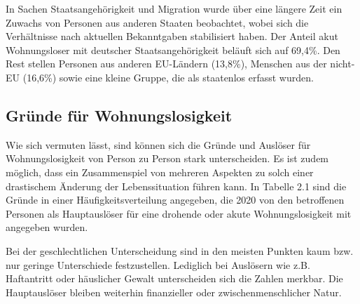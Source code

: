In Sachen Staatsangehörigkeit und Migration wurde über eine längere Zeit ein Zuwachs von Personen aus anderen Staaten beobachtet, wobei sich die Verhältnisse nach aktuellen Bekanntgaben stabilisiert haben. Der Anteil akut Wohnungsloser mit deutscher Staatsangehörigkeit beläuft sich auf 69,4\%. Den Rest stellen Personen aus anderen EU-Ländern (13,8\%), Menschen aus der nicht-EU (16,6\%) sowie eine kleine Gruppe, die als staatenlos erfasst wurden.

\subsection{Gründe für Wohnungslosigkeit}

Wie sich vermuten lässt, sind können sich die Gründe und Auslöser für Wohnungslosigkeit von Person zu Person stark unterscheiden. Es ist zudem möglich, dass ein Zusammenspiel von mehreren Aspekten zu solch einer drastischem Änderung der Lebenssituation führen kann. In Tabelle 2.1 sind die Gründe in einer Häufigkeitsverteilung angegeben, die 2020 von den betroffenen Personen als Hauptauslöser für eine drohende oder akute Wohnungslosigkeit mit angegeben wurden.

Bei der geschlechtlichen Unterscheidung sind in den meisten Punkten kaum bzw. nur geringe Unterschiede festzustellen. Lediglich bei Auslösern wie z.B. Haftantritt oder häuslicher Gewalt unterscheiden sich die Zahlen merkbar. Die Hauptauslöser bleiben weiterhin finanzieller oder zwischenmenschlicher Natur.

